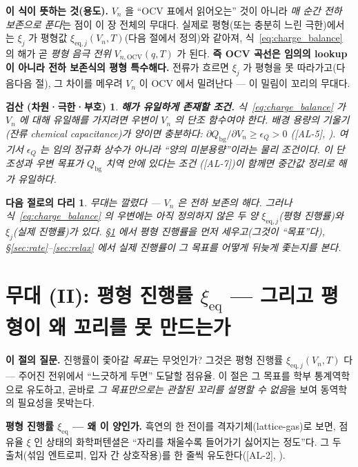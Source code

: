 \documentclass[11pt,a4paper]{article}
\newtheorem*{verifybox}{검산 (차원·극한·부호)}
\newtheorem*{bridgebox}{다음 절로의 다리}
\newcommand{\eq}{\mathrm{eq}}
\newcommand{\bg}{\mathrm{bg}}
\newcommand{\OCV}{\mathrm{OCV}}
\newcommand{\AL}[1]{\textsf{[AL-#1]}}
\begin{document}
\textbf{이 식이 뜻하는 것(용도).} $V_n$ 을 ``OCV 표에서 읽어오는'' 것이 아니라 \emph{매 순간 전하 보존으로
푼다}는 점이 이 장 전체의 무대다. 실제로 평형(또는 충분히 느린 극한)에서는 $\xi_j$ 가 평형값
$\xi_{\eq,j}(V_n,T)$(다음 절에서 정의)와 같아져, 식~\eqref{eq:charge_balance} 의 해가 곧 \emph{평형 음극
전위} $V_{n,\OCV}(q,T)$ 가 된다. \textbf{즉 OCV 곡선은 임의의 lookup 이 아니라 전하 보존식의 평형
특수해다.} 전류가 흐르면 $\xi_j$ 가 평형을 못 따라가고(다음다음 절), 그 차이를 메우려 $V_n$ 이 OCV 에서
밀려난다 — 이 밀림이 꼬리의 무대다.

\begin{verifybox}
\textbf{해가 유일하게 존재할 조건.} 식~\eqref{eq:charge_balance} 가 $V_n$ 에 대해 유일해를 가지려면 우변이
$V_n$ 의 단조 함수여야 한다. 배경 용량의 기울기(잔류 chemical capacitance)가 양이면 충분하다:
$\partial Q_\bg/\partial V_n\ge\epsilon_Q>0$ (\AL{5}, \cite{bazant2013}). 여기서 $\epsilon_Q$ 는 임의 정규화
상수가 아니라 ``양의 미분용량''이라는 물리 조건이다. 이 단조성과 우변 목표가 $Q_\bg$ 치역 안에 있다는 조건
(\AL{7})이 함께면 중간값 정리로 해가 유일하다.
\end{verifybox}

\begin{bridgebox}
무대는 깔렸다 — $V_n$ 은 전하 보존의 해다. 그러나 식~\eqref{eq:charge_balance} 의 우변에는 아직 정의하지
않은 두 양 $\xi_{\eq,j}$(평형 진행률)와 $\xi_j$(실제 진행률)가 있다. \S\ref{sec:eq} 에서 \emph{평형} 진행률을
먼저 세우고(그것이 ``목표''다), \S\ref{sec:rate}--\ref{sec:relax} 에서 실제 진행률이 그 목표를 어떻게
\emph{뒤늦게} 좇는지를 본다.
\end{bridgebox}

\section{무대 (II): 평형 진행률 $\xi_\eq$ — 그리고 평형이 왜 꼬리를 못 만드는가}\label{sec:eq}
\textbf{이 절의 질문.} 진행률이 좇아갈 \emph{목표}는 무엇인가? 그것은 평형 진행률 $\xi_{\eq,j}(V_n,T)$ 다 —
주어진 전위에서 ``느긋하게 두면'' 도달할 점유율. 이 절은 그 목표를 학부 통계역학으로 유도하고, 곧바로
\emph{그 목표만으로는 관찰된 꼬리를 설명할 수 없음}을 보여 동역학의 필요성을 못박는다.

\textbf{평형 진행률 $\xi_\eq$ — 왜 이 양인가.} 흑연의 한 전이를 격자기체(lattice-gas)로 보면, 점유율 $\xi$ 인
상태의 화학퍼텐셜은 ``자리를 채울수록 들어가기 싫어지는 정도''다. 그 두 출처(섞임 엔트로피, 입자 간
상호작용)를 한 줄씩 유도한다(\AL{2}, \cite{mckinnon1983,bazant2013}).
\end{document}
